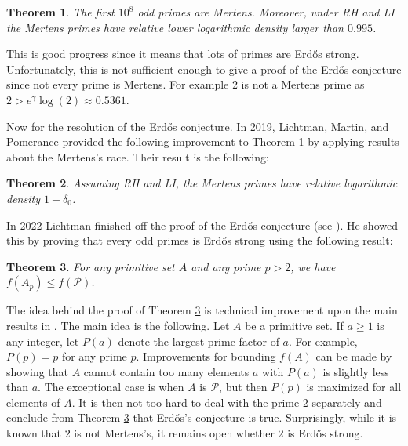 \documentclass[12pt,reqno]{amsart}
\newtheorem{theorem}{Theorem}[section]
\theoremstyle{definition}
\numberwithin{equation}{section}
\begin{document}
\begin{theorem}\label{thm:Lots_of_Mertens's_primes}
    The first $10^{8}$ odd primes are Mertens. Moreover, under RH and LI the Mertens primes have relative lower logarithmic density larger than $0.995$. 
\end{theorem}

This is good progress since it means that lots of primes are Erd\H{o}s strong. Unfortunately, this is not sufficient enough to give a proof of the Erd\H{o}s conjecture since not every prime is Mertens. For example $2$ is not a Mertens prime as $2 > e^{\gamma}\log(2) \approx 0.5361$.

Now for the resolution of the Erd\H{o}s conjecture. In 2019, Lichtman, Martin, and Pomerance provided the following improvement to  Theorem \ref{thm:Lots_of_Mertens's_primes} by applying results about the Mertens's race. Their result is the following:

\begin{theorem}
   Assuming RH and LI, the Mertens primes have relative logarithmic density $1-\delta_{0}$.
\end{theorem}

 In 2022 Lichtman finished off the proof of the Erd\H{o}s conjecture (see \cite{Li}). He showed this by proving that every odd primes is Erd\H{o}s strong using the following result:
 
\begin{theorem}\label{thm:odd_primes_are_Erdos_strong}
    For any primitive set $A$ and any prime $p > 2$, we have $f(A_{p}) \le f(\mathcal{P})$.
\end{theorem}

The idea behind the proof of Theorem \ref{thm:odd_primes_are_Erdos_strong} is technical improvement upon the main results in \cite{LP}. The main idea is the following. Let $A$ be a primitive set. If $a \ge 1$ is any integer, let $P(a)$ denote the largest prime factor of $a$. For example, $P(p) = p$ for any prime $p$. Improvements for bounding $f(A)$ can be made by showing that $A$ cannot contain too many elements $a$ with $P(a)$ is slightly less than $a$. The exceptional case is when $A$ is $\mathcal{P}$, but then $P(p)$ is maximized for all elements of $A$. It is then not too hard to deal with the prime $2$ separately and conclude from Theorem \ref{thm:odd_primes_are_Erdos_strong} that Erd\H{o}s's conjecture is true. Surprisingly, while it is known that $2$ is not Mertens's, it remains open whether $2$ is Erd\H{o}s strong. 
\end{document}
